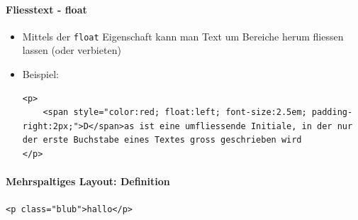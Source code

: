 \documentclass[10pt,a4paper]{article}
\begin{document}
\paragraph{Fliesstext - float}
\begin{itemize}[noitemsep,topsep=0pt,leftmargin=*]
    \item Mittels der \texttt{float} Eigenschaft kann man Text um Bereiche herum fliessen lassen (oder verbieten)
    \item Beispiel:
    \begin{lstlisting}
<p>
    <span style="color:red; float:left; font-size:2.5em; padding-right:2px;">D</span>as ist eine umfliessende Initiale, in der nur der erste Buchstabe eines Textes gross geschrieben wird
</p>
    \end{lstlisting}
\end{itemize}

\paragraph{Mehrspaltiges Layout: Definition}\lstinline|<p class="blub">hallo</p>|
\end{document}
